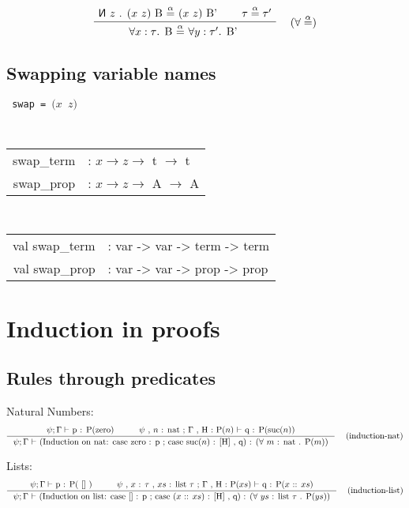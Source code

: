\documentclass[twoside,a4paper]{article}
\theoremstyle{definition}
\newcommand\new[0]{\reflectbox{\ensuremath{\mathsf{N}}}}
\begin{document}
\[
\AxiomC{$\new$ $z$ . $(x$ $z)$ B $\overset{\alpha}=$ $(x$ $z)$ B'}
\AxiomC{$\tau \overset{\alpha}= \tau'$}
\RightLabel{\quad ($\forall\overset{\alpha}=$)}
\BinaryInfC{$\forall x : \tau$. B $\overset{\alpha}=$ $\forall y : \tau' $. B' }
\DisplayProof
\]

\subsection{Swapping variable names}

\begin{center}
{\tt
swap = $(x$ $z)$
}
\end{center}

\begin{center}
{\tt
\begin{tabular}{rl}
swap_term &: $x \rightarrow z \rightarrow $ t $\rightarrow$ t
\\
swap_prop &: $x \rightarrow z \rightarrow $ A $\rightarrow$ A
\end{tabular}
}
\end{center}

\begin{center}
{\tt
\begin{tabular}{rl}
val swap_term &: var -> var -> term -> term
\\
val swap_prop &: var -> var -> prop -> prop
\end{tabular}
}
\end{center}

\section{Induction in proofs}

\subsection{Rules through predicates}

Natural Numbers:
\[
\AxiomC{
$\psi ; \Gamma \vdash$ p : P(zero)
}
\AxiomC{
$\psi$ , $n$ : nat ; $\Gamma$ , H : P($n$) $\vdash$ q : P(suc($n$))
}
\RightLabel{\quad (induction-nat)}
\BinaryInfC{
$\psi ; \Gamma$ $\vdash$
(Induction on nat: case zero : p ; case suc($n$) : [H] , q)
: ($\forall$ $m$ : nat . P($m$))
}
\DisplayProof
\]

Lists:
\[
\AxiomC{
$\psi ; \Gamma \vdash$ p : P( [] )
}
\AxiomC{
$\psi$ , $x$ : $\tau$ , $xs$ : list $\tau$ ;
$\Gamma$ , H : P($xs$) $\vdash$ q : P($x$ :: $xs$)
}
\RightLabel{\quad (induction-list)}
\BinaryInfC{
$\psi ; \Gamma$ $\vdash$
(Induction on list: case [] : p ; case ($x$ :: $xs$) : [H] , q)
: ($\forall$ $ys$ : list $\tau$ . P($ys$))
}
\DisplayProof
\]
\end{document}
